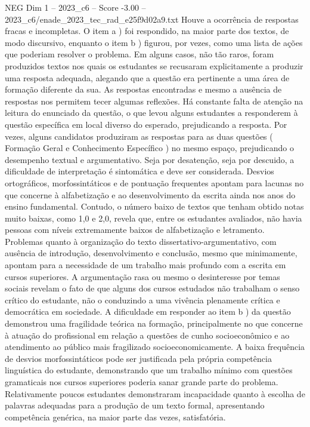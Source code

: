 \begin{textsample}{NEG Dim 1 – 2023\_c6 – Score -3.00 – 2023\_c6/enade\_2023\_tec\_rad\_e25f9d02a9.txt}
Houve a ocorrência de respostas fracas e incompletas.
O item a ) foi respondido, na maior parte dos textos, de modo discursivo, enquanto o item b ) figurou, por vezes, como uma lista de ações que poderiam resolver o problema.
Em alguns casos, não tão raros, foram produzidos textos nos quais os estudantes se recusaram explicitamente a produzir uma resposta adequada, alegando que a questão era pertinente a uma área de formação diferente da sua.
As respostas encontradas e mesmo a ausência de respostas nos permitem tecer algumas reflexões.
Há constante falta de atenção na leitura do enunciado da questão, o que levou alguns estudantes a responderem à questão específica em local diverso do esperado, prejudicando a resposta.
Por vezes, alguns candidatos produziram as respostas para as duas questões ( Formação Geral e Conhecimento Específico ) no mesmo espaço, prejudicando o desempenho textual e argumentativo.
Seja por desatenção, seja por descuido, a dificuldade de interpretação é sintomática e deve ser considerada.
Desvios ortográficos, morfossintáticos e de pontuação frequentes apontam para lacunas no que concerne à alfabetização e ao desenvolvimento da escrita ainda nos anos do ensino fundamental.
Contudo, o número baixo de textos que tenham obtido notas muito baixas, como 1,0 e 2,0, revela que, entre os estudantes avaliados, não havia pessoas com níveis extremamente baixos de alfabetização e letramento.
Problemas quanto à organização do texto dissertativo-argumentativo, com ausência de introdução, desenvolvimento e conclusão, mesmo que minimamente, apontam para a necessidade de um trabalho mais profundo com a escrita em cursos superiores.
A argumentação rasa ou mesmo o desinteresse por temas sociais revelam o fato de que alguns dos cursos estudados não trabalham o senso crítico do estudante, não o conduzindo a uma vivência plenamente crítica e democrática em sociedade.
A dificuldade em responder ao item b ) da questão demonstrou uma fragilidade teórica na formação, principalmente no que concerne à atuação do profissional em relação a questões de cunho socioeconômico e ao atendimento ao público mais fragilizado socioeconomicamente.
A baixa frequência de desvios morfossintáticos pode ser justificada pela própria competência linguística do estudante, demonstrando que um trabalho mínimo com questões gramaticais nos cursos superiores poderia sanar grande parte do problema.
Relativamente poucos estudantes demonstraram incapacidade quanto à escolha de palavras adequadas para a produção de um texto formal, apresentando competência genérica, na maior parte das vezes, satisfatória.

\end{textsample}
